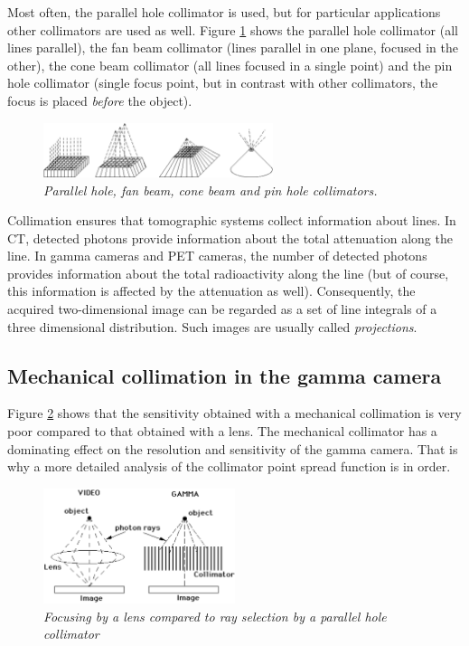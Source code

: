 \documentclass[11pt,oneside]{book}
\begin{document}
Most often, the parallel hole collimator is used, but for particular
applications other collimators are used as well. Figure \ref{fig:collimators}
shows the parallel hole collimator (all lines parallel), the fan beam
collimator (lines parallel in one plane, focused in the other), the cone beam
collimator (all lines focused in a single point) and the pin hole collimator
(single focus point, but in contrast with other collimators, the focus is
placed {\em before} the object).

\begin{figure}[tb]
\centering
\includegraphics[width=0.6\textwidth]{figs/fig_collimators.pdf}
\caption{\label{fig:collimators} \emph{Parallel hole, fan beam, cone beam and
pin hole collimators.}}
\end{figure}

Collimation ensures that tomographic systems collect information about
lines.  In CT, detected photons provide information about the total
attenuation along the line. In gamma cameras and PET cameras, the
number of detected photons provides information about the total
radioactivity along the line (but of course, this information is
affected by the attenuation as well). Consequently, the acquired
two-dimensional image can be regarded as a set of line integrals of a
three dimensional distribution. Such images are usually called {\em
projections}.

\subsection{Mechanical collimation in the gamma camera} \label{sec:collimation}
Figure \ref{fig:lenscollimator} shows that the sensitivity obtained
with a mechanical collimation is very poor compared to that obtained with a
lens. The mechanical collimator has a dominating effect on the resolution and
sensitivity of the gamma camera. That is why a more detailed analysis of the
collimator point spread function is in order.

\begin{figure}[tb]
\centering
\includegraphics[width=0.5\textwidth]{figs/fig_lenscollimator.pdf}
\caption{\label{fig:lenscollimator} \emph{Focusing by a lens compared to ray
selection by a parallel hole collimator}}
\end{figure}
\end{document}
